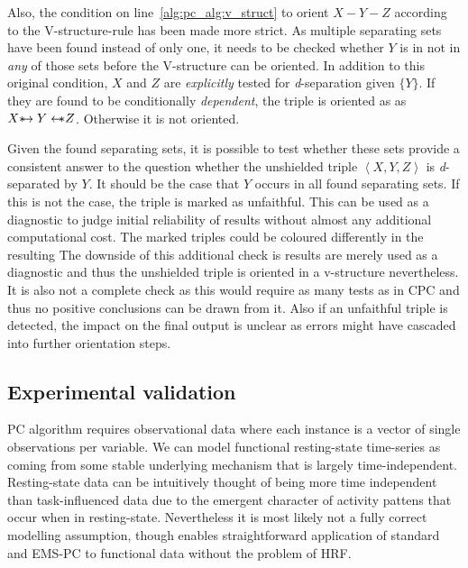 \documentclass[a4paper, english]{article}
\def \srightarrow {\text{\textasteriskcentered}\hspace{-0.62em}\rightarrow}
\def \sleftarrow {\leftarrow\hspace{-0.62em}\text{\textasteriskcentered}}
\begin{document}
Also, the condition on line~\ref{alg:pc_alg:v_struct} to orient $X - Y - Z$ according to the V-structure-rule has been made more strict.
As multiple separating sets have been found instead of only one, it needs to be checked whether $Y$ is in not in \emph{any} of those sets before the V-structure can be oriented.
In addition to this original condition, $X$ and $Z$ are \textit{explicitly} tested for \textit{d}-separation given $\{Y\}$.
If they are found to be conditionally \textit{dependent}, the triple is oriented as as $X \srightarrow Y \sleftarrow Z$.
Otherwise it is not oriented.

Given the found separating sets, it is possible to test whether these sets provide a consistent answer to the question whether the unshielded triple $\left<X,Y,Z\right>$ is \textit{d}-separated by $Y$.
It should be the case that $Y$ occurs in all found separating sets.
If this is not the case, the triple is marked as unfaithful.
This can be used as a diagnostic to judge initial reliability of results without almost any additional computational cost.
The marked triples could be coloured differently in the resulting 
The downside of this additional check is results are merely used as a diagnostic and thus the unshielded triple is oriented in a v-structure nevertheless.
It is also not a complete check as this would require as many tests as in CPC and thus no positive conclusions can be drawn from it.
Also if an unfaithful triple is detected, the impact on the final output is unclear as errors might have cascaded into further orientation steps.

\subsection{Experimental validation}
PC algorithm requires observational data where each instance is a vector of single observations per variable.
We can model functional resting-state time-series as coming from some stable underlying mechanism that is largely time-independent.
Resting-state data can be intuitively thought of being more time independent than task-influenced data due to the emergent character of activity pattens that occur when in resting-state.
Nevertheless it is most likely not a fully correct modelling assumption, though enables straightforward application of standard and EMS-PC to functional data without the problem of HRF.
\end{document}
